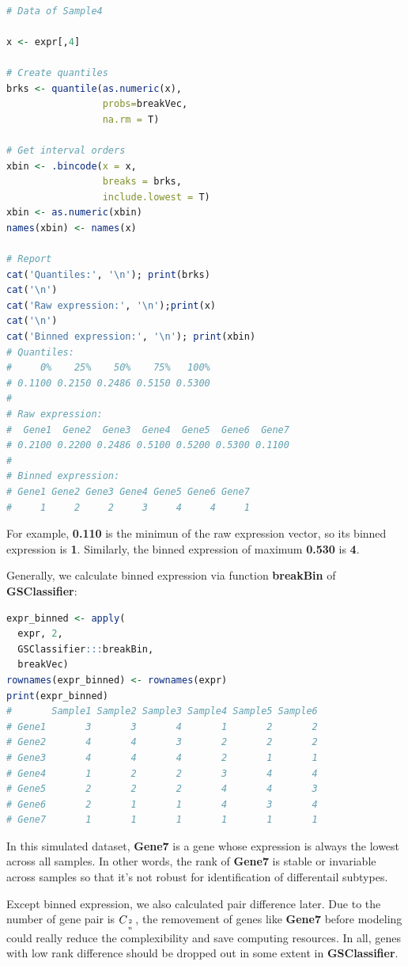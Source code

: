 \documentclass[
  12pt,
]{book}
\begin{document}
\begin{lstlisting}[language=R]

# Data of Sample4

x <- expr[,4]

# Create quantiles  
brks <- quantile(as.numeric(x), 
                 probs=breakVec, 
                 na.rm = T)

# Get interval orders
xbin <- .bincode(x = x, 
                 breaks = brks, 
                 include.lowest = T)
xbin <- as.numeric(xbin)
names(xbin) <- names(x)

# Report
cat('Quantiles:', '\n'); print(brks)
cat('\n')
cat('Raw expression:', '\n');print(x)
cat('\n')
cat('Binned expression:', '\n'); print(xbin)
# Quantiles: 
#     0%    25%    50%    75%   100% 
# 0.1100 0.2150 0.2486 0.5150 0.5300 
# 
# Raw expression: 
#  Gene1  Gene2  Gene3  Gene4  Gene5  Gene6  Gene7 
# 0.2100 0.2200 0.2486 0.5100 0.5200 0.5300 0.1100 
# 
# Binned expression: 
# Gene1 Gene2 Gene3 Gene4 Gene5 Gene6 Gene7 
#     1     2     2     3     4     4     1
\end{lstlisting}

For example, \textbf{0.110} is the minimun of the raw expression vector, so its binned expression is \textbf{1}. Similarly, the binned expression of maximum \textbf{0.530} is \textbf{4}.

Generally, we calculate binned expression via function \textbf{breakBin} of \textbf{GSClassifier}:

\begin{lstlisting}[language=R]
expr_binned <- apply(
  expr, 2, 
  GSClassifier:::breakBin,
  breakVec)
rownames(expr_binned) <- rownames(expr)
print(expr_binned)
#       Sample1 Sample2 Sample3 Sample4 Sample5 Sample6
# Gene1       3       3       4       1       2       2
# Gene2       4       4       3       2       2       2
# Gene3       4       4       4       2       1       1
# Gene4       1       2       2       3       4       4
# Gene5       2       2       2       4       4       3
# Gene6       2       1       1       4       3       4
# Gene7       1       1       1       1       1       1
\end{lstlisting}

In this simulated dataset, \textbf{Gene7} is a gene whose expression is always the lowest across all samples. In other words, the rank of \textbf{Gene7} is stable or invariable across samples so that it's not robust for identification of differentail subtypes.

Except binned expression, we also calculated pair difference later. Due to the number of gene pair is \(C_{2 \atop n}\), the removement of genes like \textbf{Gene7} before modeling could really reduce the complexibility and save computing resources. In all, genes with low rank difference should be dropped out in some extent in \textbf{GSClassifier}.
\end{document}
